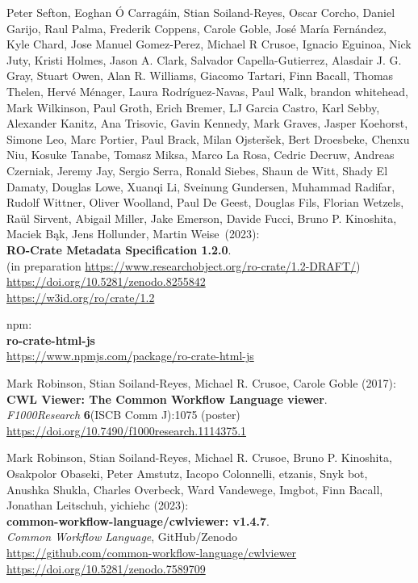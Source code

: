 \begin{thebibliography}{9}
Peter Sefton, Eoghan Ó Carragáin, Stian Soiland-Reyes, Oscar
Corcho, Daniel Garijo, Raul Palma, Frederik Coppens, Carole Goble, José
María Fernández, Kyle Chard, Jose Manuel Gomez-Perez, Michael R Crusoe,
Ignacio Eguinoa, Nick Juty, Kristi Holmes, Jason A. Clark, Salvador
Capella-Gutierrez, Alasdair J. G. Gray, Stuart Owen, Alan R. Williams,
Giacomo Tartari, Finn Bacall, Thomas Thelen, Hervé Ménager, Laura
Rodríguez-Navas, Paul Walk, brandon whitehead, Mark Wilkinson, Paul
Groth, Erich Bremer, LJ Garcia Castro, Karl Sebby, Alexander Kanitz, Ana
Trisovic, Gavin Kennedy, Mark Graves, Jasper Koehorst, Simone Leo, Marc
Portier, Paul Brack, Milan Ojsteršek, Bert Droesbeke, Chenxu Niu, Kosuke Tanabe, Tomasz Miksa, Marco La Rosa, Cedric Decruw, Andreas Czerniak, Jeremy Jay, Sergio Serra, Ronald Siebes, Shaun de Witt, Shady El Damaty, Douglas Lowe, Xuanqi Li, Sveinung Gundersen, Muhammad Radifar,
Rudolf Wittner, Oliver Woolland, Paul De Geest, Douglas Fils, Florian Wetzels, Raül Sirvent,
Abigail Miller, Jake Emerson, Davide Fucci, Bruno P. Kinoshita, Maciek Bąk,
Jens Hollunder, Martin Weise~(2023):\\
\textbf{RO-Crate Metadata Specification 1.2.0}.\\
(in preparation \url{https://www.researchobject.org/ro-crate/1.2-DRAFT/})\\
\url{https://doi.org/10.5281/zenodo.8255842}\\
\url{https://w3id.org/ro/crate/1.2}

npm:\\
\textbf{ro-crate-html-js}\\
\url{https://www.npmjs.com/package/ro-crate-html-js}

Mark Robinson, Stian Soiland-Reyes, Michael R. Crusoe, Carole Goble (2017):\\
\textbf{CWL Viewer: The Common Workflow Language viewer}.\\
\emph{F1000Research} \textbf{6}(ISCB Comm J):1075 (poster)\\
\url{https://doi.org/10.7490/f1000research.1114375.1} 

Mark Robinson, Stian Soiland-Reyes, Michael R. Crusoe, Bruno P. Kinoshita, Osakpolor Obaseki, Peter Amstutz, Iacopo Colonnelli, etzanis, Snyk bot, Anushka Shukla, Charles Overbeck, Ward Vandewege, Imgbot, Finn Bacall, Jonathan Leitschuh, yichiehc (2023):\\
\textbf{common-workflow-language/cwlviewer: v1.4.7}.\\
\emph{Common Workflow Language}, GitHub/Zenodo\\
\url{https://github.com/common-workflow-language/cwlviewer}\\
\url{https://doi.org/10.5281/zenodo.7589709}



\end{thebibliography}
